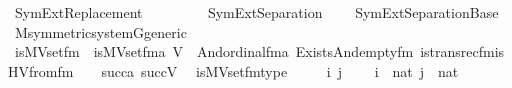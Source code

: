 %
\begin{isabellebody}%
%
%
\isadelimtheory
%
\endisadelimtheory
%
\isatagtheory
{}\isamarkupfalse%
\ SymExt{\isacharunderscore}{\kern0pt}Replacement\isanewline
\ \ \ \ \isanewline
\ \ \ \ SymExt{\isacharunderscore}{\kern0pt}Separation\isanewline
\ \ \ \ SymExt{\isacharunderscore}{\kern0pt}Separation{\isacharunderscore}{\kern0pt}Base\isanewline
{}%
\endisatagtheory
{\isafoldtheory}%
%
\isadelimtheory
\ \isanewline
%
\endisadelimtheory
\isanewline
{}\isamarkupfalse%
\ M{\isacharunderscore}{\kern0pt}symmetric{\isacharunderscore}{\kern0pt}system{\isacharunderscore}{\kern0pt}G{\isacharunderscore}{\kern0pt}generic\isanewline
{}\isanewline
\isanewline
{}\isamarkupfalse%
\ is{\isacharunderscore}{\kern0pt}MVset{\isacharunderscore}{\kern0pt}fm\ \ {\isachardoublequoteopen}is{\isacharunderscore}{\kern0pt}MVset{\isacharunderscore}{\kern0pt}fm{\isacharparenleft}{\kern0pt}a{\isacharcomma}{\kern0pt}\ V{\isacharparenright}{\kern0pt}\ {\isasymequiv}\ And{\isacharparenleft}{\kern0pt}ordinal{\isacharunderscore}{\kern0pt}fm{\isacharparenleft}{\kern0pt}a{\isacharparenright}{\kern0pt}{\isacharcomma}{\kern0pt}\ Exists{\isacharparenleft}{\kern0pt}And{\isacharparenleft}{\kern0pt}empty{\isacharunderscore}{\kern0pt}fm{\isacharparenleft}{\kern0pt}{}{\isacharparenright}{\kern0pt}{\isacharcomma}{\kern0pt}\ is{\isacharunderscore}{\kern0pt}transrec{\isacharunderscore}{\kern0pt}fm{\isacharparenleft}{\kern0pt}is{\isacharunderscore}{\kern0pt}HVfrom{\isacharunderscore}{\kern0pt}fm{\isacharparenleft}{\kern0pt}{}{\isacharcomma}{\kern0pt}\ {}{\isacharcomma}{\kern0pt}\ {}{\isacharcomma}{\kern0pt}\ {}{\isacharparenright}{\kern0pt}{\isacharcomma}{\kern0pt}\ succ{\isacharparenleft}{\kern0pt}a{\isacharparenright}{\kern0pt}{\isacharcomma}{\kern0pt}\ succ{\isacharparenleft}{\kern0pt}V{\isacharparenright}{\kern0pt}{\isacharparenright}{\kern0pt}{\isacharparenright}{\kern0pt}{\isacharparenright}{\kern0pt}{\isacharparenright}{\kern0pt}{\isachardoublequoteclose}\ \isanewline
\isanewline
{}\isamarkupfalse%
\ is{\isacharunderscore}{\kern0pt}MVset{\isacharunderscore}{\kern0pt}fm{\isacharunderscore}{\kern0pt}type\ {\isacharcolon}{\kern0pt}\ \isanewline
\ \ \ i\ j\ \isanewline
\ \ \ {\isachardoublequoteopen}i\ {\isasymin}\ nat{\isachardoublequoteclose}\ {\isachardoublequoteopen}j\ {\isasymin}\ nat{\isachardoublequoteclose}\ \isanewline

\end{isabellebody}
